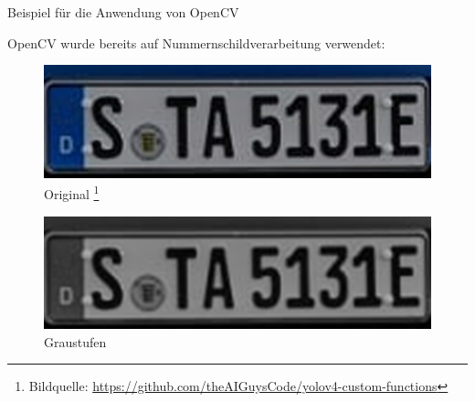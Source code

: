 \begin{frame}{Beispiel für die Anwendung von OpenCV}

OpenCV wurde bereits auf Nummernschildverarbeitung verwendet:
\begin{figure}
\begin{center}
\includegraphics[scale=0.25]{bilder/Nummer_1.png}
\caption{Original
\footnote{Bildquelle: \url{https://github.com/theAIGuysCode/yolov4-custom-functions}}}
\label{Original}
\end{center}
\end{figure}

\begin{figure}
\begin{center}
\includegraphics[scale=0.25]{bilder/Nummer_2_grau.png}
\caption{Graustufen}
\label{Graustufen}
\end{center}
\end{figure}

\end{frame}

